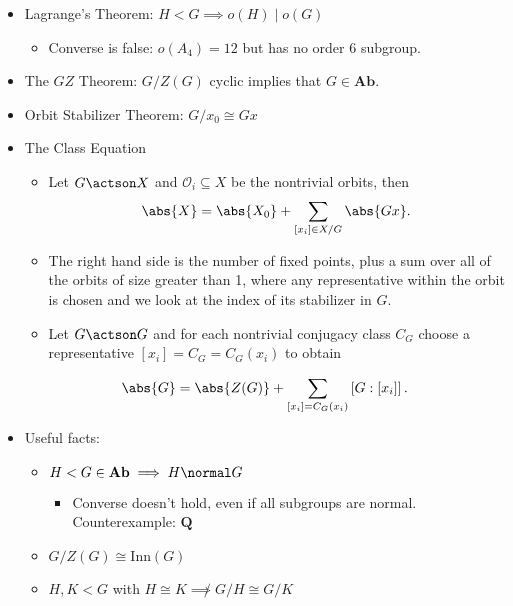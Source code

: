 \begin{itemize}
\item
  Lagrange's Theorem: \(H < G \implies o(H) \mid o(G)\)

  \begin{itemize}
  \tightlist
  \item
    Converse is false: \(o(A_4) = 12\) but has no order 6 subgroup.
  \end{itemize}
\item
  The \(GZ\) Theorem: \(G/Z(G)\) cyclic implies that
  \(G \in \mathbf{Ab}\).
\item
  Orbit Stabilizer Theorem: \(G / x_0 \cong Gx\)
\item
  The Class Equation

  \begin{itemize}
  \tightlist
  \item
    Let \(G\actson X\) and \(\mathcal{O}_i \subseteq X\) be the
    nontrivial orbits, then
    \begin{align*}  
    \abs{X} = \abs{ X_0 } + \sum_{[x_i] \in X/G} \abs{Gx} 
    .\end{align*}
  \item
    The right hand side is the number of fixed points, plus a sum over
    all of the orbits of size greater than 1, where any representative
    within the orbit is chosen and we look at the index of its
    stabilizer in \(G\).
  \item
    Let \(G\actson G\) and for each nontrivial conjugacy class \(C_G\)
    choose a representative \([x_i] = C_G = C_G(x_i)\) to obtain
  \end{itemize}

  \begin{align*}  
  \abs{G} = \abs{Z(G)} + \sum_{[x_i] = C_G(x_i)} \left[ G: [x_i] \right]
  .\end{align*}
\item
  Useful facts:

  \begin{itemize}
  \tightlist
  \item
    \(H < G \in \mathbf{Ab} \implies H \normal G\)

    \begin{itemize}
    \tightlist
    \item
      Converse doesn't hold, even if all subgroups are normal.
      Counterexample: \(\mathbf{Q}\)
    \end{itemize}
  \item
    \(G / Z(G) \cong \mathrm{Inn}(G)\)
  \item
    \(H, K < G\) with \(H \cong K \not\implies G/H \cong G/K\)


\end{itemize}
\end{itemize}
